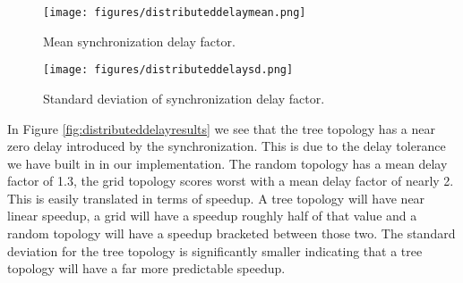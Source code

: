 \begin{figure*}
    \centering
    \begin{subfigure}{0.5\textwidth}
    \centering
        \texttt{[image: figures/distributeddelaymean.png]}
        \caption{Mean synchronization delay factor.}
    \end{subfigure}%
    \begin{subfigure}{0.5\textwidth}
    \centering
        \texttt{[image: figures/distributeddelaysd.png]}
        \caption{Standard deviation of synchronization delay factor.}
    \end{subfigure}
    \caption{Synchronization overhead introduced by topologies.}
    \label{fig:distributeddelayresults}
    \end{figure*}
In Figure \ref{fig:distributeddelayresults} we see that the tree topology has a near zero delay introduced by the synchronization. This is due to the delay tolerance we have built in in our implementation. The random topology has a mean delay factor of 1.3, the grid topology scores worst with a mean delay factor of nearly 2. This is easily translated in terms of speedup. A tree topology will have near linear speedup, a grid will have a speedup roughly half of that value and a random topology will have a speedup bracketed between those two. The standard deviation for the tree topology is significantly smaller indicating that a tree topology will have a far more predictable speedup.